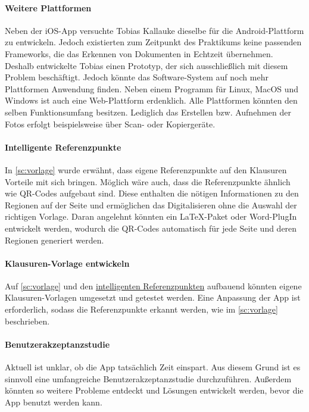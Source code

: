 \documentclass[notables, nomenclature, oneside, 150]{HSMW-Thesis}
\begin{document}
	\paragraph*{Weitere Plattformen} 
		Neben der iOS-App versuchte Tobias Kallauke dieselbe für die Android-Plattform zu entwickeln. Jedoch existierten zum Zeitpunkt des Praktikums keine passenden Frameworks, die das Erkennen von Dokumenten in Echtzeit übernehmen. Deshalb entwickelte Tobias einen Prototyp, der sich ausschließlich mit diesem Problem beschäftigt. Jedoch könnte das Software-System auf noch mehr Plattformen Anwendung finden. Neben einem Programm für Linux, MacOS und Windows ist auch eine Web-Plattform erdenklich. Alle Plattformen könnten den selben Funktionsumfang besitzen. Lediglich das Erstellen bzw. Aufnehmen der Fotos erfolgt beispielsweise über Scan- oder Kopiergeräte.
	
	\paragraph*{Intelligente Referenzpunkte}\label{pa:referenzpunkte}
		In \autoref{sc:vorlage} wurde erwähnt, dass eigene Referenzpunkte auf den Klausuren Vorteile mit sich bringen. Möglich wäre auch, dass die Referenzpunkte ähnlich wie QR-Codes aufgebaut sind. Diese enthalten die nötigen Informationen zu den Regionen auf der Seite und ermöglichen das Digitalisieren ohne die Auswahl der richtigen Vorlage. Daran angelehnt könnten ein \LaTeX -Paket oder Word-PlugIn entwickelt werden, wodurch die QR-Codes automatisch für jede Seite und deren Regionen generiert werden. 
	
	\paragraph*{Klausuren-Vorlage entwickeln}
		Auf \autoref{sc:vorlage} und den \hyperref[pa:referenzpunkte]{intelligenten Referenzpunkten} aufbauend könnten eigene Klausuren-Vorlagen umgesetzt und getestet werden. Eine Anpassung der App ist erforderlich, sodass die Referenzpunkte erkannt werden, wie im \autoref{sc:vorlage} beschrieben.
		
	\paragraph*{Benutzerakzeptanzstudie}\label{pa:akzeptanz}
		Aktuell ist unklar, ob die App tatsächlich Zeit einspart. Aus diesem Grund ist es sinnvoll eine umfangreiche Benutzerakzeptanzstudie durchzuführen. Außerdem könnten so weitere Probleme entdeckt und Lösungen entwickelt werden, bevor die App benutzt werden kann.
	
\end{document}
